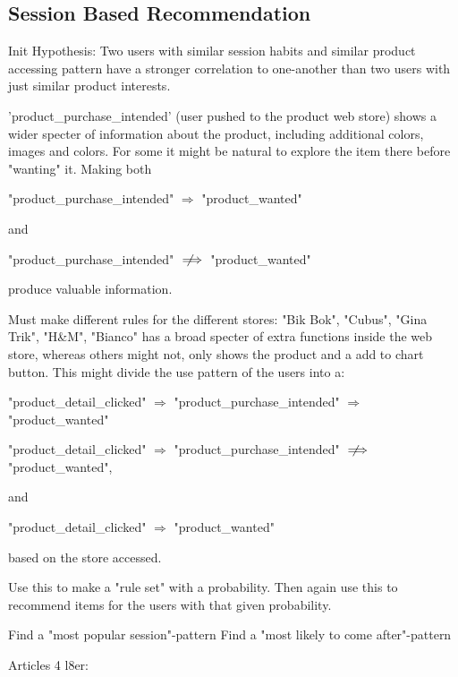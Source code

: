 \subsection{Session Based Recommendation}
Init Hypothesis:
Two users with similar session habits and similar product accessing pattern
have a stronger correlation to one-another than two users with just similar
product interests.


'product\_purchase\_intended' (user pushed to the product web store) shows a
wider specter of information about the product, including additional colors,
images and colors.  For some it might be natural to explore the item there
before "wanting" it. Making both

"product\_purchase\_intended" $\Rightarrow$ "product\_wanted"

and

"product\_purchase\_intended" $\notimplies$ "product\_wanted"

produce valuable information.

Must make different rules for the different stores:
"Bik Bok", "Cubus", "Gina Trik", "H\&M", "Bianco" has a broad specter of extra
functions inside the web store, whereas others might not, only shows the
product and a add to chart button.  This might divide the use pattern of the
users into a:

"product\_detail\_clicked" $\Rightarrow$ "product\_purchase\_intended" $\Rightarrow$ "product\_wanted"

"product\_detail\_clicked" $\Rightarrow$ "product\_purchase\_intended" $\notimplies$ "product\_wanted",

and

"product\_detail\_clicked" $\Rightarrow$ "product\_wanted"

based on the store accessed.

Use this to make a "rule set" with a probability.
Then again use this to recommend items for the users with that given
probability.

Find a "most popular session"-pattern
Find a "most likely to come after"-pattern


Articles 4 l8er:

